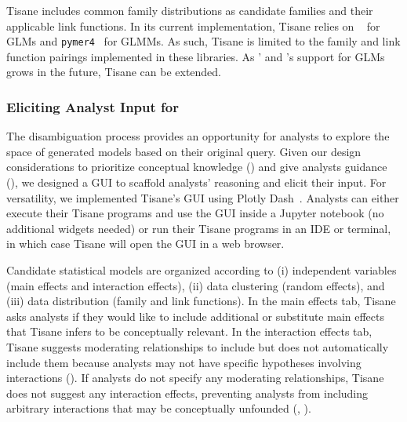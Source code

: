 Tisane includes common family distributions as candidate families and their
applicable link functions. In its current implementation, Tisane relies on
\statsmodels~\cite{statsmodelsPaper} for GLMs and
\texttt{pymer4}~\cite{jolly2018pymer4} for GLMMs. As such,
Tisane is limited to the family and link function pairings implemented in these libraries. As
\statsmodels' and \pymer's support for GLMs grows in the future, Tisane can be extended.

\subsubsection{Eliciting Analyst Input for \Disambiguation}\label{sec:disambiguation}
\groupExerciseDisambiguation
The disambiguation process provides an opportunity for analysts to explore the
space of generated models based on their original query. Given our design
considerations to prioritize conceptual knowledge (\dcConceptualKnowledge) and
give analysts guidance (\dcGuidance), we designed a GUI to scaffold analysts' reasoning and elicit their input.
For versatility, we implemented Tisane's GUI using Plotly
Dash~\cite{plotlyDash}. Analysts can either execute their Tisane programs and use the
GUI inside a Jupyter notebook (no additional widgets needed) or run
their Tisane programs in an IDE or terminal, in which case Tisane will open the
GUI in a web browser. 

Candidate statistical models are organized according to (i) independent
variables  (main effects and interaction effects), (ii) data clustering (random
effects), and (iii) data distribution (family and link functions). In the main
effects tab, Tisane asks analysts if they would like to include additional or
substitute main effects that Tisane infers to be conceptually relevant. In the
interaction effects tab, Tisane suggests moderating relationships to include but
does not automatically include them because analysts may not have specific
hypotheses involving interactions (\dcGuidance). If analysts do not specify any
moderating relationships, Tisane does not suggest any interaction effects,
preventing analysts from including arbitrary interactions that may be
conceptually unfounded (\dcConceptualKnowledge, \dcValidity).


